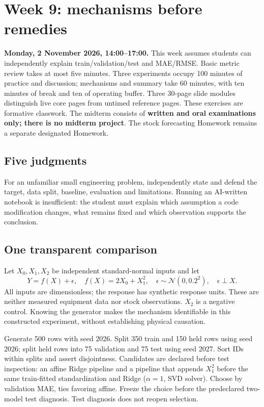 \section{Week 9: mechanisms before remedies}
\textbf{Monday, 2 November 2026, 14:00--17:00.} This week assumes students can independently explain train/validation/test and MAE/RMSE. Basic metric review takes at most five minutes. Three experiments occupy 100 minutes of practice and discussion; mechanisms and summary take 60 minutes, with ten minutes of break and ten of operating buffer. Three 30-page slide modules distinguish live core pages from untimed reference pages. These exercises are formative classwork. The midterm consists of \textbf{written and oral examinations only; there is no midterm project}. The stock forecasting Homework remains a separate designated Homework.

\subsection{Five judgments}
For an unfamiliar small engineering problem, independently state and defend the target, data split, baseline, evaluation and limitations. Running an AI-written notebook is insufficient: the student must explain which assumption a code modification changes, what remains fixed and which observation supports the conclusion.

\subsection{One transparent comparison}
Let $X_0,X_1,X_2$ be independent standard-normal inputs and let
\[
Y=f(X)+\epsilon,\quad f(X)=2X_0+X_1^2,\quad
\epsilon\sim\mathcal N(0,0.2^2),\quad \epsilon\perp X.
\]
All inputs are dimensionless; the response has synthetic response units. These are neither measured equipment data nor stock observations. $X_2$ is a negative control. Knowing the generator makes the mechanism identifiable in this constructed experiment, without establishing physical causation.

Generate 500 rows with seed 2026. Split 350 train and 150 held rows using seed 2026; split held rows into 75 validation and 75 test using seed 2027. Sort IDs within splits and assert disjointness. Candidates are declared before test inspection: an affine Ridge pipeline and a pipeline that appends $X_1^2$ before the same train-fitted standardization and Ridge ($\alpha=1$, SVD solver). Choose by validation MAE, ties favoring affine. Freeze the choice before the predeclared two-model test diagnosis. Test diagnosis does not reopen selection.

